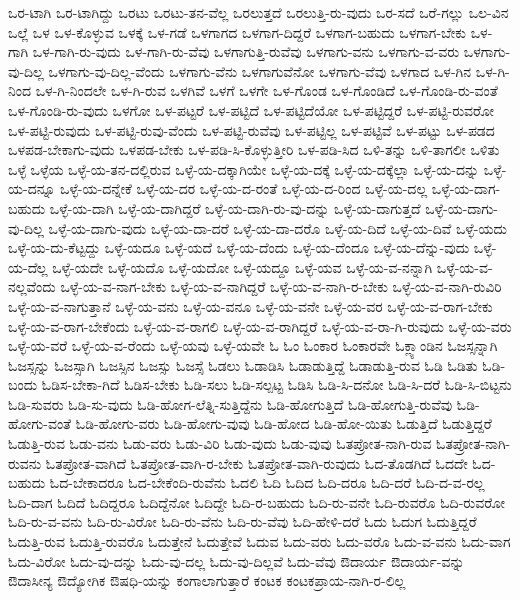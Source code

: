 {ಒರ-ಟಾಗಿ
ಒರ-ಟಾಗಿದ್ದು
ಒರಟು
ಒರಟು-ತನ-ವೆಲ್ಲ
ಒರಲುತ್ತದೆ
ಒರಲುತ್ತಿ-ರು-ವುದು
ಒರ-ಸದೆ
ಒರೆ-ಗಲ್ಲು
ಒಲ-ವಿನ
ಒಲ್ಲೆ
ಒಳ
ಒಳ-ಕೊಳ್ಳುವ
ಒಳಕ್ಕೆ
ಒಳ-ಗಡೆ
ಒಳಗಾಗದ
ಒಳಗಾಗ-ದಿದ್ದರೆ
ಒಳಗಾಗ-ಬಹುದು
ಒಳಗಾಗ-ಬೇಕು
ಒಳ-ಗಾಗಿ
ಒಳ-ಗಾಗಿ-ರು-ವುದು
ಒಳ-ಗಾಗಿ-ರು-ವೆವು
ಒಳಗಾಗುತ್ತಿ-ರುವೆವು
ಒಳಗಾಗು-ವನು
ಒಳಗಾಗು-ವ-ವರು
ಒಳಗಾಗು-ವು-ದಿಲ್ಲ
ಒಳಗಾಗು-ವು-ದಿಲ್ಲ-ವೆಂದು
ಒಳಗಾಗು-ವೆನು
ಒಳಗಾಗುವೆನೋ
ಒಳಗಾಗು-ವೆವು
ಒಳಗಾದ
ಒಳ-ಗಿನ
ಒಳ-ಗಿ-ನಿಂದ
ಒಳ-ಗಿ-ನಿಂದಲೇ
ಒಳ-ಗಿ-ರುವ
ಒಳಗಿವೆ
ಒಳಗೆ
ಒಳಗೇ
ಒಳ-ಗೊಂಡ
ಒಳ-ಗೊಂಡಿದೆ
ಒಳ-ಗೊಂಡಿ-ರು-ವಂತೆ
ಒಳ-ಗೊಂಡಿ-ರು-ವುದು
ಒಳಗೋ
ಒಳ-ಪಟ್ಟರೆ
ಒಳ-ಪಟ್ಟಿದೆ
ಒಳ-ಪಟ್ಟಿದೆಯೋ
ಒಳ-ಪಟ್ಟಿದ್ದರೆ
ಒಳ-ಪಟ್ಟಿ-ರುವರೋ
ಒಳ-ಪಟ್ಟಿ-ರುವುದು
ಒಳ-ಪಟ್ಟಿ-ರುವು-ವೆಂದು
ಒಳ-ಪಟ್ಟಿ-ರುವೆವು
ಒಳ-ಪಟ್ಟಿಲ್ಲ
ಒಳ-ಪಟ್ಟಿವೆ
ಒಳ-ಪಟ್ಟು
ಒಳ-ಪಡದ
ಒಳಪಡ-ಬೇಕಾಗು-ವುದು
ಒಳಪಡ-ಬೇಕು
ಒಳ-ಪಡಿ-ಸಿ-ಕೊಳ್ಳುತ್ತೀರಿ
ಒಳ-ಪಡಿ-ಸಿದ
ಒಳಿ-ತನ್ನು
ಒಳಿ-ತಾಗಲೀ
ಒಳಿತು
ಒಳ್ಳೆ
ಒಳ್ಳೆಯ
ಒಳ್ಳೆ-ಯ-ತನ-ದಲ್ಲಿರುವ
ಒಳ್ಳೆ-ಯ-ದಕ್ಕಾಗಿಯೇ
ಒಳ್ಳೆ-ಯ-ದಕ್ಕೆ
ಒಳ್ಳೆ-ಯ-ದಕ್ಕೆಲ್ಲಾ
ಒಳ್ಳೆ-ಯ-ದನ್ನು
ಒಳ್ಳೆ-ಯ-ದನ್ನೂ
ಒಳ್ಳೆ-ಯ-ದನ್ನೇಕೆ
ಒಳ್ಳೆ-ಯ-ದರ
ಒಳ್ಳೆ-ಯ-ದ-ರಂತೆ
ಒಳ್ಳೆ-ಯ-ದ-ರಿಂದ
ಒಳ್ಳೆ-ಯ-ದಲ್ಲ
ಒಳ್ಳೆ-ಯ-ದಾಗ-ಬಹುದು
ಒಳ್ಳೆ-ಯ-ದಾಗಿ
ಒಳ್ಳೆ-ಯ-ದಾಗಿದ್ದರೆ
ಒಳ್ಳೆ-ಯ-ದಾಗಿ-ರು-ವು-ದನ್ನು
ಒಳ್ಳೆ-ಯ-ದಾಗುತ್ತದೆ
ಒಳ್ಳೆ-ಯ-ದಾಗು-ವು-ದಿಲ್ಲ
ಒಳ್ಳೆ-ಯ-ದಾಗು-ವುದು
ಒಳ್ಳೆ-ಯ-ದಾ-ದರೆ
ಒಳ್ಳೆ-ಯ-ದಾ-ದರೊ
ಒಳ್ಳೆ-ಯ-ದಿದೆ
ಒಳ್ಳೆ-ಯ-ದಿವೆ
ಒಳ್ಳೆ-ಯದು
ಒಳ್ಳೆ-ಯ-ದು-ಕೆಟ್ಟದ್ದು
ಒಳ್ಳೆ-ಯದೂ
ಒಳ್ಳೆ-ಯದೆ
ಒಳ್ಳೆ-ಯ-ದೆಂದು
ಒಳ್ಳೆ-ಯ-ದೆಂದೂ
ಒಳ್ಳೆ-ಯ-ದೆನ್ನು-ವುದು
ಒಳ್ಳೆ-ಯ-ದೆಲ್ಲ
ಒಳ್ಳೆ-ಯದೇ
ಒಳ್ಳೆ-ಯದೊ
ಒಳ್ಳೆ-ಯದೋ
ಒಳ್ಳೆ-ಯದ್ದೂ
ಒಳ್ಳೆ-ಯವ
ಒಳ್ಳೆ-ಯ-ವ-ನನ್ನಾಗಿ
ಒಳ್ಳೆ-ಯ-ವ-ನಲ್ಲವೆಂದು
ಒಳ್ಳೆ-ಯ-ವ-ನಾಗ-ಬೇಕು
ಒಳ್ಳೆ-ಯ-ವ-ನಾಗಿದ್ದರೆ
ಒಳ್ಳೆ-ಯ-ವ-ನಾಗಿ-ರ-ಬೇಕು
ಒಳ್ಳೆ-ಯ-ವ-ನಾಗಿ-ರುವಿರಿ
ಒಳ್ಳೆ-ಯ-ವ-ನಾಗುತ್ತಾನೆ
ಒಳ್ಳೆ-ಯ-ವನು
ಒಳ್ಳೆ-ಯ-ವನೂ
ಒಳ್ಳೆ-ಯ-ವನೇ
ಒಳ್ಳೆ-ಯ-ವರ
ಒಳ್ಳೆ-ಯ-ವ-ರಾಗ-ಬೇಕು
ಒಳ್ಳೆ-ಯ-ವ-ರಾಗ-ಬೇಕೆಂದು
ಒಳ್ಳೆ-ಯ-ವ-ರಾಗಲಿ
ಒಳ್ಳೆ-ಯ-ವ-ರಾಗಿದ್ದರೆ
ಒಳ್ಳೆ-ಯ-ವ-ರಾ-ಗಿ-ರುವುದು
ಒಳ್ಳೆ-ಯ-ವರು
ಒಳ್ಳೆ-ಯ-ವರೆ
ಒಳ್ಳೆ-ಯ-ವ-ರೆಂದು
ಒಳ್ಳೆ-ಯವು
ಒಳ್ಳೆ-ಯವೇ
ಓ
ಓಂ
ಓಂಕಾರ
ಓಂಕಾರವೇ
ಓಕ್ಲ್ಯಾಂಡಿನ
ಓಜಸ್ಸನ್ನಾಗಿ
ಓಜಸ್ಸನ್ನು
ಓಜಸ್ಸಾಗಿ
ಓಜಸ್ಸಿನ
ಓಜಸ್ಸು
ಓಜಸ್ಸೆ
ಓಡಲು
ಓಡಾಡಿಸಿ
ಓಡಾಡುತ್ತಿದ್ದೆ
ಓಡಾಡುತ್ತಿ-ರುವ
ಓಡಿ
ಓಡಿತು
ಓಡಿ-ಬಂದು
ಓಡಿಸ-ಬೇಕಾ-ಗಿದೆ
ಓಡಿಸ-ಬೇಕು
ಓಡಿ-ಸಲು
ಓಡಿ-ಸಲ್ಪಟ್ಟ
ಓಡಿಸಿ
ಓಡಿ-ಸಿ-ದನೋ
ಓಡಿ-ಸಿ-ದರೆ
ಓಡಿ-ಸಿ-ಬಿಟ್ಟನು
ಓಡಿ-ಸುವರು
ಓಡಿ-ಸು-ವುದು
ಓಡಿ-ಹೋಗ-ಲೆತ್ನಿ-ಸುತ್ತಿದ್ದೆನು
ಓಡಿ-ಹೋಗುತ್ತಿದೆ
ಓಡಿ-ಹೋಗುತ್ತಿ-ರುವೆವು
ಓಡಿ-ಹೋಗು-ವಂತೆ
ಓಡಿ-ಹೋಗು-ವರು
ಓಡಿ-ಹೋಗು-ವುವು
ಓಡಿ-ಹೋದ
ಓಡಿ-ಹೋ-ಯಿತು
ಓಡುತ್ತಿದೆ
ಓಡುತ್ತಿದ್ದರೆ
ಓಡುತ್ತಿ-ರುವ
ಓಡು-ವನು
ಓಡು-ವರು
ಓಡು-ವಿರಿ
ಓಡು-ವುದು
ಓಡು-ವುವು
ಓತಪ್ರೋತ-ನಾಗಿ-ರುವ
ಓತಪ್ರೋತ-ನಾಗಿ-ರುವನು
ಓತಪ್ರೋತ-ವಾಗಿದೆ
ಓತಪ್ರೋತ-ವಾಗಿ-ರ-ಬೇಕು
ಓತಪ್ರೋತ-ವಾಗಿ-ರುವುದು
ಓದ-ತೊಡಗಿದೆ
ಓದದೇ
ಓದ-ಬಹುದು
ಓದ-ಬೇಕಾದರೂ
ಓದ-ಬೇಕೆಂದಿ-ರುವೆನು
ಓದಲಿ
ಓದಿ
ಓದಿದ
ಓದಿ-ದರೂ
ಓದಿ-ದರೆ
ಓದಿ-ದ-ವ-ರಲ್ಲ
ಓದಿ-ದಾಗ
ಓದಿದೆ
ಓದಿದ್ದರೂ
ಓದಿದ್ದೆನೋ
ಓದಿದ್ದೇ
ಓದಿ-ರ-ಬಹುದು
ಓದಿ-ರು-ವನೇ
ಓದಿ-ರುವರೊ
ಓದಿ-ರುವರೋ
ಓದಿ-ರು-ವ-ವನು
ಓದಿ-ರು-ವಿರೋ
ಓದಿ-ರು-ವೆನು
ಓದಿ-ರು-ವೆವು
ಓದಿ-ಹೇಳಿ-ದರೆ
ಓದು
ಓದುಗ
ಓದುತ್ತಿದ್ದರೆ
ಓದುತ್ತಿ-ರುವ
ಓದುತ್ತಿ-ರುವರೊ
ಓದುತ್ತೇನೆ
ಓದುತ್ತೇವೆ
ಓದುವ
ಓದು-ವರು
ಓದು-ವರೊ
ಓದು-ವ-ವನು
ಓದು-ವಾಗ
ಓದು-ವಿರೋ
ಓದು-ವು-ದನ್ನು
ಓದು-ವು-ದಲ್ಲ
ಓದು-ವು-ದಿಲ್ಲವೆ
ಓದು-ವೆವು
ಔದಾರ್ಯ
ಔದಾರ್ಯ-ವನ್ನು
ಔದಾಸೀನ್ಯ
ಔದ್ಯೋಗಿಕ
ಔಷಧಿ-ಯನ್ನು
ಕಂಗಾಲಾಗುತ್ತಾರೆ
ಕಂಟಕ
ಕಂಟಕಪ್ರಾಯ-ನಾಗಿ-ರ-ಲಿಲ್ಲ
}
